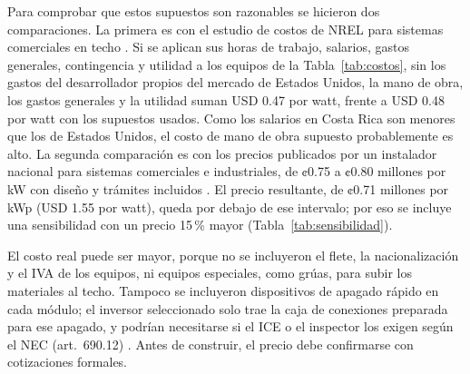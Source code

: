 Para comprobar que estos supuestos son razonables se hicieron dos comparaciones. La primera es con el estudio de costos de NREL para sistemas comerciales en techo \cite{nrel_benchmark}. Si se aplican sus horas de trabajo, salarios, gastos generales, contingencia y utilidad a los equipos de la Tabla~\ref{tab:costos}, sin los gastos del desarrollador propios del mercado de Estados Unidos, la mano de obra, los gastos generales y la utilidad suman USD 0.47 por watt, frente a USD 0.48 por watt con los supuestos usados. Como los salarios en Costa Rica son menores que los de Estados Unidos, el costo de mano de obra supuesto probablemente es alto. La segunda comparación es con los precios publicados por un instalador nacional para sistemas comerciales e industriales, de ¢0.75 a ¢0.80 millones por kW con diseño y trámites incluidos \cite{sunshine_precios}. El precio resultante, de ¢0.71 millones por kWp (USD 1.55 por watt), queda por debajo de ese intervalo; por eso se incluye una sensibilidad con un precio 15\,\% mayor (Tabla~\ref{tab:sensibilidad}).

El costo real puede ser mayor, porque no se incluyeron el flete, la nacionalización y el IVA de los equipos, ni equipos especiales, como grúas, para subir los materiales al techo. Tampoco se incluyeron dispositivos de apagado rápido en cada módulo; el inversor seleccionado solo trae la caja de conexiones preparada para ese apagado, y podrían necesitarse si el ICE o el inspector los exigen según el NEC (art.\ 690.12) \cite{nec2014}. Antes de construir, el precio debe confirmarse con cotizaciones formales.

